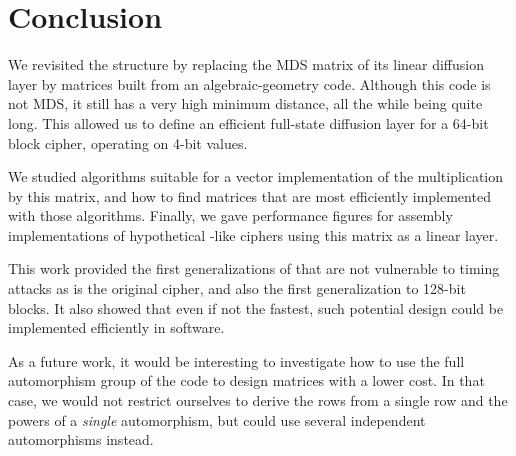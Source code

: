 \section{Conclusion}

We revisited the \shark{} structure by replacing the MDS matrix of its linear diffusion layer by matrices built from an algebraic-geometry code.
Although this code is not MDS, it still has a very high minimum distance, all the while being quite long.
This allowed us to define an efficient full-state diffusion layer for a 64-bit block cipher, operating on 4-bit values.

We studied algorithms suitable for a vector implementation of the multiplication by this matrix, and how to find matrices that are most efficiently implemented with
those algorithms.
Finally, we gave performance figures for assembly implementations of hypothetical \shark-like ciphers using this matrix as a linear layer.

This work provided the first generalizations of \shark{} that are not vulnerable to timing attacks as is the
original cipher, and also the first generalization to 128-bit blocks. It also showed that even if not the fastest, such potential design could be implemented efficiently in software.

As a future work, it would be interesting to investigate how to use the full automorphism group of the code to design matrices with a lower cost. In that case, we would not restrict
ourselves to derive the rows from a single row and the powers of a \emph{single} automorphism, but could use several independent automorphisms instead. 
